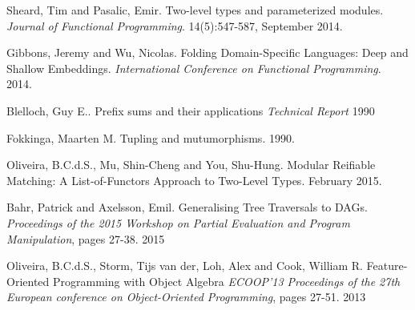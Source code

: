 \documentclass[nocopyrightspace]{sigplanconf}
\begin{document}
\begin{thebibliography}{}
\softraggedright

  Sheard, Tim and Pasalic, Emir.
  Two-level types and parameterized modules.
  \emph{Journal of Functional Programming}.
  14(5):547-587, September 2014.

  Gibbons, Jeremy and Wu, Nicolas.
  Folding Domain-Specific Languages: Deep and Shallow Embeddings.
  \emph{International Conference on Functional Programming}.
  2014.

  Blelloch, Guy E..
  Prefix sums and their applications
  \emph{Technical Report}
  1990

  Fokkinga, Maarten M.
  Tupling and mutumorphisms.
  1990.

  Oliveira, B.C.d.S., Mu, Shin-Cheng and You, Shu-Hung.
  Modular Reifiable Matching: A List-of-Functors Approach to Two-Level Types.
  February 2015.

  Bahr, Patrick and Axelsson, Emil.
  Generalising Tree Traversals to DAGs.
  \emph{Proceedings of the 2015 Workshop on Partial Evaluation and Program Manipulation},
  pages 27-38.
  2015

  Oliveira, B.C.d.S., Storm, Tijs van der, Loh, Alex and Cook, William R.
  Feature-Oriented Programming with Object Algebra
  \emph{ECOOP'13 Proceedings of the 27th European conference on Object-Oriented Programming},
  pages 27-51.
  2013

\end{thebibliography}
\end{document}
